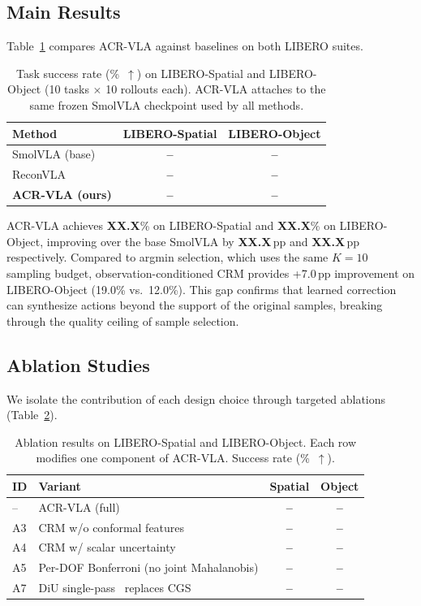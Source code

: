 \subsection{Main Results}
\label{sec:main_results}

Table~\ref{tab:main} compares ACR-VLA against baselines on both LIBERO suites.

\begin{table}[t]
\centering
\caption{Task success rate (\%~$\uparrow$) on LIBERO-Spatial and LIBERO-Object (10 tasks $\times$ 10 rollouts each). ACR-VLA attaches to the same frozen SmolVLA checkpoint used by all methods.}
\label{tab:main}
\small
\begin{tabular}{lcc}
\toprule
Method & LIBERO-Spatial & LIBERO-Object \\
\midrule
SmolVLA (base) & \textbf{--} & \textbf{--} \\
ReconVLA~\cite{chen2026reconvla} & \textbf{--} & \textbf{--} \\
\textbf{ACR-VLA (ours)} & \textbf{--} & \textbf{--} \\
\bottomrule
\end{tabular}
\end{table}

ACR-VLA achieves \textbf{XX.X}\% on LIBERO-Spatial and \textbf{XX.X}\% on LIBERO-Object, improving over the base SmolVLA by \textbf{XX.X}\,pp and \textbf{XX.X}\,pp respectively.
Compared to argmin selection, which uses the same $K{=}10$ sampling budget, observation-conditioned CRM provides +7.0\,pp improvement on LIBERO-Object (19.0\% vs.\ 12.0\%).
This gap confirms that learned correction can synthesize actions beyond the support of the original samples, breaking through the quality ceiling of sample selection.


\subsection{Ablation Studies}
\label{sec:ablations}

We isolate the contribution of each design choice through targeted ablations (Table~\ref{tab:ablation}).

\begin{table}[t]
\centering
\caption{Ablation results on LIBERO-Spatial and LIBERO-Object. Each row modifies one component of ACR-VLA. Success rate (\%~$\uparrow$).}
\label{tab:ablation}
\small
\begin{tabular}{llcc}
\toprule
ID & Variant & Spatial & Object \\
\midrule
-- & ACR-VLA (full) & \textbf{--} & \textbf{--} \\
\midrule
A3 & CRM w/o conformal features & \textbf{--} & \textbf{--} \\
A4 & CRM w/ scalar uncertainty & \textbf{--} & \textbf{--} \\
A5 & Per-DOF Bonferroni (no joint Mahalanobis) & \textbf{--} & \textbf{--} \\
A7 & DiU single-pass~\cite{xing2026diu} replaces CGS & \textbf{--} & \textbf{--} \\
\bottomrule
\end{tabular}
\end{table}

